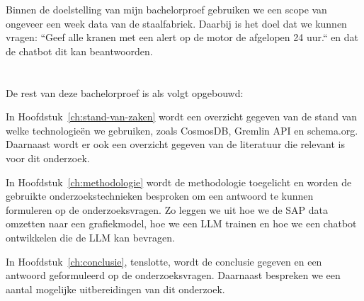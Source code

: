 Binnen de doelstelling van mijn bachelorproef gebruiken we een scope van ongeveer een week data van de staalfabriek. 
Daarbij is het doel dat we kunnen vragen: ``Geef alle kranen met een alert op de motor de afgelopen 24 uur.`` en dat de chatbot dit kan beantwoorden.
\section{}%
\label{sec:opzet-bachelorproef}


De rest van deze bachelorproef is als volgt opgebouwd:

In Hoofdstuk~\ref{ch:stand-van-zaken} wordt een overzicht gegeven van de stand van welke technologieën we gebruiken, zoals CosmosDB, Gremlin API en schema.org.
Daarnaast wordt er ook een overzicht gegeven van de literatuur die relevant is voor dit onderzoek.

In Hoofdstuk~\ref{ch:methodologie} wordt de methodologie toegelicht en worden de gebruikte onderzoekstechnieken besproken om een antwoord te kunnen formuleren op de onderzoeksvragen.
Zo leggen we uit hoe we de SAP data omzetten naar een grafiekmodel, hoe we een LLM trainen en hoe we een chatbot ontwikkelen die de LLM kan bevragen.


In Hoofdstuk~\ref{ch:conclusie}, tenslotte, wordt de conclusie gegeven en een antwoord geformuleerd op de onderzoeksvragen. Daarnaast bespreken we een aantal mogelijke uitbereidingen van dit onderzoek.